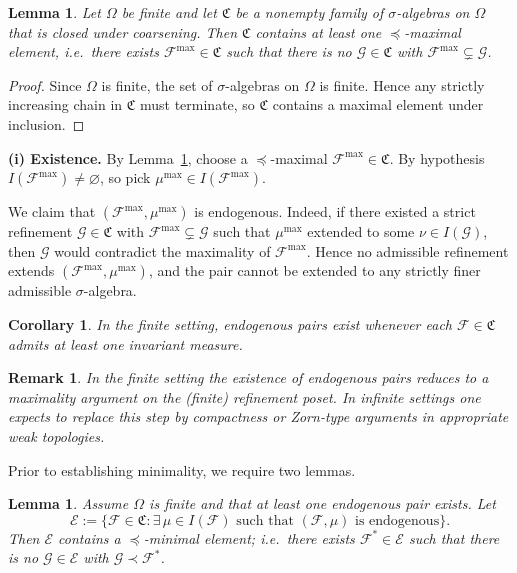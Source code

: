 \documentclass[
 amsmath,amssymb,
  onecolumn %
]{revtex4-2}
\newtheorem{lemma}[theorem]{Lemma}
\newtheorem{corollary}[theorem]{Corollary}
\newtheorem{remark}[theorem]{Remark}
\begin{document}
\begin{lemma}\label{lem:maxsigma}
Let $\Omega$ be finite and let $\mathfrak C$ be a nonempty family of
$\sigma$-algebras on $\Omega$ that is closed under coarsening.
Then $\mathfrak C$ contains at least one $\preceq$-maximal element,
i.e.\ there exists $\mathcal F^{\max}\in\mathfrak C$ such that there is no
$\mathcal G\in\mathfrak C$ with $\mathcal F^{\max}\subsetneq \mathcal G$.
\end{lemma}

\begin{proof}
Since $\Omega$ is finite, the set of $\sigma$-algebras on $\Omega$ is finite.
Hence any strictly increasing chain in $\mathfrak C$ must terminate, so
$\mathfrak C$ contains a maximal element under inclusion.
\end{proof}



\medskip
\noindent\textbf{(i) Existence.}
By Lemma~\ref{lem:maxsigma}, choose a $\preceq$-maximal
$\mathcal F^{\max}\in\mathfrak C$.
By hypothesis $I(\mathcal F^{\max})\neq\varnothing$, so pick
$\mu^{\max}\in I(\mathcal F^{\max})$.

We claim that $(\mathcal F^{\max},\mu^{\max})$ is endogenous.
Indeed, if there existed a strict refinement
$\mathcal G\in\mathfrak C$ with $\mathcal F^{\max}\subsetneq\mathcal G$
such that $\mu^{\max}$ extended to some $\nu\in I(\mathcal G)$,
then $\mathcal G$ would contradict the maximality of $\mathcal F^{\max}$.
Hence no admissible refinement extends $(\mathcal F^{\max},\mu^{\max})$,
and the pair cannot be extended to any strictly finer admissible
$\sigma$-algebra.

\begin{corollary}
In the finite setting, endogenous pairs exist whenever each
$\mathcal F\in\mathfrak C$ admits at least one invariant measure.
\end{corollary}

\begin{remark}
In the finite setting the existence of endogenous pairs reduces to a maximality
argument on the (finite) refinement poset. In infinite settings one expects to
replace this step by compactness or Zorn-type arguments in appropriate weak
topologies.
\end{remark}

Prior to establishing minimality, we require two lemmas. 

\begin{lemma}\label{lem:min-endog}
Assume $\Omega$ is finite and that at least one endogenous pair exists.
Let
\[
\mathcal E := \{\mathcal F\in \mathfrak C : \exists\,\mu\in I(\mathcal F)
\text{ such that } (\mathcal F,\mu)\text{ is endogenous}\}.
\]
Then $\mathcal E$ contains a $\preceq$-minimal element; i.e.\ there exists
$\mathcal F^\ast\in\mathcal E$ such that there is no
$\mathcal G\in\mathcal E$ with $\mathcal G\prec \mathcal F^\ast$.
\end{lemma}
\end{document}
